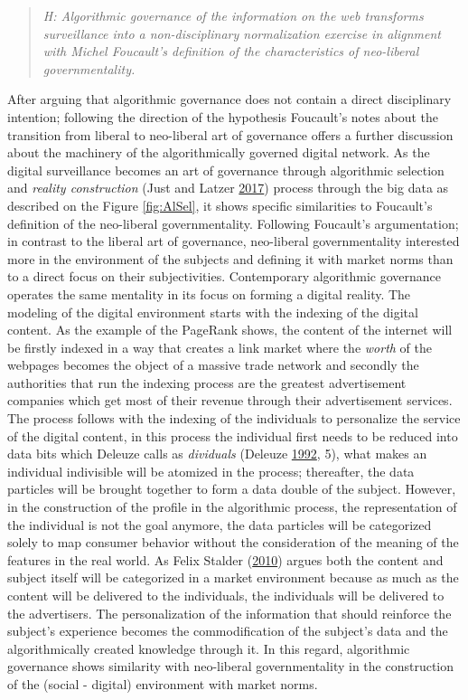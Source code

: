 \documentclass[12pt,twoside]{report}
\begin{document}
\begin{quote}
\emph{H: Algorithmic governance of the information on the web transforms surveillance into a non-disciplinary normalization exercise in alignment with Michel Foucault's definition of the characteristics of neo-liberal governmentality.}
\end{quote}

After arguing that algorithmic governance does not contain a direct disciplinary intention; following the direction of the hypothesis Foucault's notes about the transition from liberal to neo-liberal art of governance offers a further discussion about the machinery of the algorithmically governed digital network. As the digital surveillance becomes an art of governance through algorithmic selection and \emph{reality construction} (Just and Latzer \protect\hyperlink{ref-Just2017}{2017}) process through the big data as described on the Figure \ref{fig:AlSel}, it shows specific similarities to Foucault's definition of the neo-liberal governmentality. Following Foucault's argumentation; in contrast to the liberal art of governance, neo-liberal governmentality interested more in the environment of the subjects and defining it with market norms than to a direct focus on their subjectivities. Contemporary algorithmic governance operates the same mentality in its focus on forming a digital reality. The modeling of the digital environment starts with the indexing of the digital content. As the example of the PageRank shows, the content of the internet will be firstly indexed in a way that creates a link market where the \emph{worth} of the webpages becomes the object of a massive trade network and secondly the authorities that run the indexing process are the greatest advertisement companies which get most of their revenue through their advertisement services. The process follows with the indexing of the individuals to personalize the service of the digital content, in this process the individual first needs to be reduced into data bits which Deleuze calls as \emph{dividuals} (Deleuze \protect\hyperlink{ref-Deleuze1992}{1992}, 5), what makes an individual indivisible will be atomized in the process; thereafter, the data particles will be brought together to form a data double of the subject. However, in the construction of the profile in the algorithmic process, the representation of the individual is not the goal anymore, the data particles will be categorized solely to map consumer behavior without the consideration of the meaning of the features in the real world. As Felix Stalder (\protect\hyperlink{ref-Stalder2009}{2010}) argues both the content and subject itself will be categorized in a market environment because as much as the content will be delivered to the individuals, the individuals will be delivered to the advertisers. The personalization of the information that should reinforce the subject's experience becomes the commodification of the subject's data and the algorithmically created knowledge through it. In this regard, algorithmic governance shows similarity with neo-liberal governmentality in the construction of the (social - digital) environment with market norms.
\end{document}
